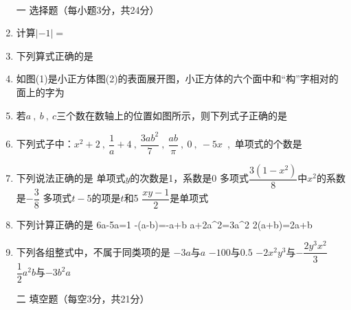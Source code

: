 \documentclass[11pt,twoside]{ctexart}
\begin{document}
%
%
\begin{center}\bs{}

\\
{\kaishu{}}
\end{center}

\zongfenlana

%
%
\begin{enumerate}
\item[\kaishu{}一]{\kaishu{}\dafenlan{}选择题（每小题3分，共24分）}%
\item 计算$|-1|=$

\item 下列算式正确的是

\item 如图(1)是小正方体图(2)的表面展开图，小正方体的六个面中和“构”字相对的面上的字为


\item 若$a~,~b~,~c$三个数在数轴上的位置如图所示，则下列式子正确的是


\item 下列式子中：$x^2+2~,~\dfrac{1}{a}+4~,~\dfrac{3ab^2}{7}~,~\dfrac{ab}{\pi}~,~0~,~-5x$~,~单项式的个数是
\item 下列说法正确的是
\xx
{单项式$y$的次数是1，系数是0}
{多项式$\dfrac{3(1-x^2)}{8}$中$x^2$的系数是$-\dfrac{3}{8}$}
{多项式$t-5$的项是$t$和5}
{$\dfrac{xy-1}{2}$是单项式}
\item 下列计算正确的是
\xxs
{6a-5a=1}
{-(a-b)=-a+b}
{a+2a^2=3a^2}
{2(a+b)=2a+b}
\item 下列各组整式中，不属于同类项的是
\xx
{$-3a$与$a$}
{$-100$与$0.5$}
{$-2x^2y^3$与$-\dfrac{2y^3x^2}{3}$}
{$\dfrac{1}{2}a^2b$与$-3b^2a$}

\item[\kaishu{}二]{\kaishu{}\dafenlan{}填空题（每空3分，共21分）}%


\end{enumerate}
\end{document}
